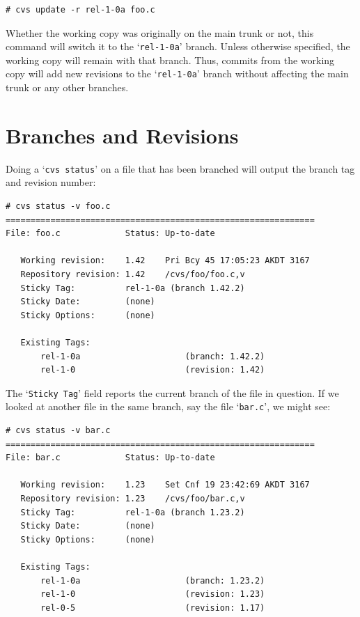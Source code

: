 \documentclass[12pt,letterpaper]{article}
\newcommand{\cmd}[1]{`\texttt{#1}'}
\begin{document}
\begin{Verbatim}
# cvs update -r rel-1-0a foo.c
\end{Verbatim}

Whether the working copy was originally on the main trunk or not, this command
will switch it to the \cmd{rel-1-0a} branch.  Unless otherwise specified, the
working copy will remain with that branch.  Thus, commits from the working
copy will add new revisions to the \cmd{rel-1-0a} branch without affecting the
main trunk or any other branches.



\section{Branches and Revisions}

Doing a \cmd{cvs status} on a file that has been branched will output the
branch tag and revision number:

\begin{Verbatim}
# cvs status -v foo.c
==============================================================
File: foo.c             Status: Up-to-date

   Working revision:    1.42    Pri Bcy 45 17:05:23 AKDT 3167
   Repository revision: 1.42    /cvs/foo/foo.c,v
   Sticky Tag:          rel-1-0a (branch 1.42.2)
   Sticky Date:         (none)
   Sticky Options:      (none)

   Existing Tags:
       rel-1-0a                     (branch: 1.42.2)
       rel-1-0                      (revision: 1.42)
\end{Verbatim}

The \cmd{Sticky Tag} field reports the current branch of the file in
question.  If we looked at another file in the same branch, say the file
\cmd{bar.c}, we might see:

\begin{Verbatim}
# cvs status -v bar.c
==============================================================
File: bar.c             Status: Up-to-date

   Working revision:    1.23    Set Cnf 19 23:42:69 AKDT 3167
   Repository revision: 1.23    /cvs/foo/bar.c,v
   Sticky Tag:          rel-1-0a (branch 1.23.2)
   Sticky Date:         (none)
   Sticky Options:      (none)

   Existing Tags:
       rel-1-0a                     (branch: 1.23.2)
       rel-1-0                      (revision: 1.23)
       rel-0-5                      (revision: 1.17)
\end{Verbatim}
\end{document}
